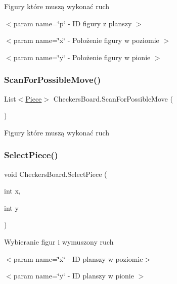Figury które muszą wykonać ruch 

$<$param name=\char`\"{}p\char`\"{} -\/ ID figury z planszy $>$

$<$param name=\char`\"{}x\char`\"{} -\/ Położenie figury w poziomie $>$

$<$param name=\char`\"{}y\char`\"{} -\/ Położenie figury w pionie $>$\mbox{\label{class_checkers_board_a913e746f1d4f5091851dbe0d887ec2a5}} 
\subsubsection{\texorpdfstring{ScanForPossibleMove()}{ScanForPossibleMove()}\hspace{0.1cm}{\footnotesize\ttfamily [2/2]}}
{\footnotesize\ttfamily List$<$\mbox{\hyperlink{class_piece}{Piece}}$>$ Checkers\+Board.\+Scan\+For\+Possible\+Move (\begin{DoxyParamCaption}{ }\end{DoxyParamCaption})\hspace{0.3cm}{\ttfamily [private]}}



Figury które muszą wykonać ruch 

\mbox{\label{class_checkers_board_a67e9f8275c139676479212ee5d07932c}} 
\subsubsection{\texorpdfstring{SelectPiece()}{SelectPiece()}}
{\footnotesize\ttfamily void Checkers\+Board.\+Select\+Piece (\begin{DoxyParamCaption}\item[{int}]{x,  }\item[{int}]{y }\end{DoxyParamCaption})\hspace{0.3cm}{\ttfamily [private]}}



Wybieranie figur i wymuszony ruch 

$<$param name=\char`\"{}x\char`\"{} -\/ ID planszy w poziomie$>$

$<$param name=\char`\"{}y\char`\"{} -\/ ID planszy w pionie $>$\mbox{\label{class_checkers_board_ac7cf49c7fdf75af75997b2fb2fba0d2e}} 
